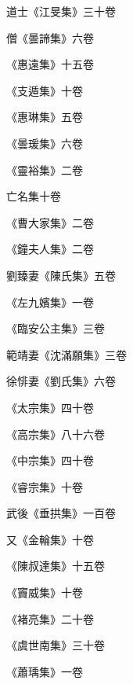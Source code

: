 \begin{pinyinscope}
 道士《江旻集》三十卷



 僧《曇諦集》六卷



 《惠遠集》十五卷



 《支遁集》十卷



 《惠琳集》五卷



 《曇瑗集》六卷



 《靈裕集》二卷



 亡名集十卷



 《曹大家集》二卷



 《鐘夫人集》二卷



 劉臻妻《陳氏集》五卷



 《左九嬪集》一卷



 《臨安公主集》三卷



 範靖妻《沈滿願集》三卷



 徐悱妻《劉氏集》六卷



 《太宗集》四十卷



 《高宗集》八十六卷



 《中宗集》四十卷



 《睿宗集》十卷



 武後《垂拱集》一百卷



 又《金輪集》十卷



 《陳叔達集》十五卷



 《竇威集》十卷



 《褚亮集》二十卷



 《虞世南集》三十卷



 《蕭瑀集》一卷




\end{pinyinscope}
